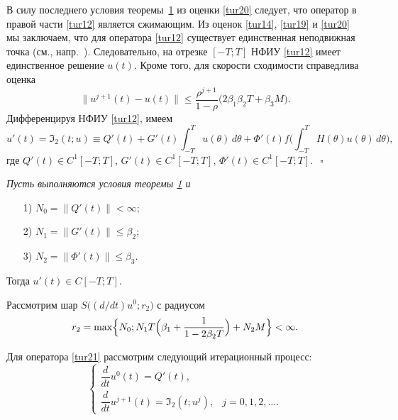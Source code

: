 В силу последнего условия теоремы~\hyperlink{yuld:th1}{1} из оценки \eqref{tur20} следует, что оператор в правой части \eqref{tur12} является сжимающим. 
Из оценок \eqref{tur14}, \eqref{tur19} и \eqref{tur20} мы заключаем, что для оператора \eqref{tur12} существует единственная неподвижная точка (см., напр.~\cite[стр. 389--401]{yul:2211}). 
Следовательно, на отрезке  $[-T ;  T]$ НФИУ \eqref{tur12} имеет единственное решение $ u (t)$. 
Кроме того, для скорости сходимости справедлива оценка
$$
\| u^{j+1} (t)-u (t) \| 
\le \frac{\rho^{j+1}}{1-\rho}  \bigl(2  \beta_1  \beta_2  T+\beta_3  M \bigr) .
$$
Дифференцируя НФИУ \eqref{tur12}, имеем
\begin{equation}
u' (t) =\Im_{2} (t; u) \equiv Q' (t)+ G' (t)  
\int _{-T}^T u (\theta) \, d \theta + 
\Phi' (t)  f \biggl( \int _{-T}^T H (\theta)  u (\theta) \, d \theta \biggr) ,  \label{tur21}
\end{equation}
где $Q' (t) \in C^{ 1 } [-T ;  T]$, 
$G' (t) \in C^{ 1 } [-T ;  T]$, 
$\Phi' (t) \in C^{ 1} [-T ;  T]$.~$~\square$

\smallskip


\hypertarget{yuld:th2}{}
  
\begin{theorem}[2]\it  Пусть выполняются условия теоремы {\rm \hyperlink{yuld:th1}{1}} и 
\begin{itemize}
\item[\rm 1)]
$N_{ 0}= \| Q' (t) \|<\infty;$
\item[\rm 2)]
$N_{ 1}= \| G' (t) \| \le \beta_{2};$
\item[\rm 3)]
$N_{ 2}= \| \Phi' (t) \| \le \beta_{ 3}.$
\end{itemize}
Тогда $ u' (t) \in C [-T ;  T].$
\end{theorem} 

\smallskip
	
\proof Рассмотрим шар 
$S \bigl( ({d}/{d t}) u^{ 0} ; r_2 \bigr)$ с радиусом 
$$
r_2=\max \Bigl\{ N_{ 0} ;  N_{ 1}  T  \Bigl(\beta_1+\dfrac{1}{1-2  \beta_2  T} \Bigr) +N_{ 2}  M \Bigr\}<\infty . 
$$ 

Для оператора \eqref{tur21} рассмотрим следующий итерационный процесс:
\begin {equation}\label{tur22}
\begin{cases} 
 \dfrac{d}{d t} u^{ 0} (t) =Q' (t) , & \\
 \dfrac{d}{d t} u^{ j+1} (t) =\Im_{ 2} (t; u^{ j}), & j=0 , 1 , 2 , \ldots . 
\end{cases}
\end{equation} 

